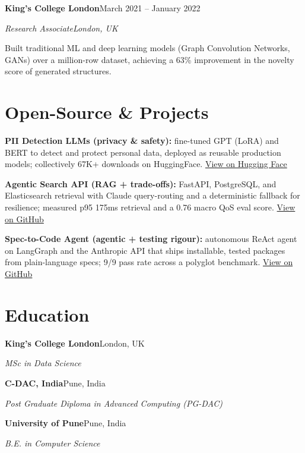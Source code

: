 \documentclass[10pt,a4paper]{article}
\newcommand{\entry}[4]{%
  {\color{company}\bfseries #1}\hfill {\color{muted}#2}\par
  \vspace{1pt}
  {\itshape #3}\hfill {\color{muted}\itshape #4}\par
  \vspace{3pt}%
}
\begin{document}
\entry{King's College London}{March 2021 -- January 2022}{Research Associate}{London, UK}
\begin{tight}
  \item Built traditional ML and deep learning models (Graph Convolution Networks, GANs) over a million-row dataset, achieving a 63\% improvement in the novelty score of generated structures.
\end{tight}

\section{Open-Source \& Projects}
\begin{tight}
  \item \textbf{PII Detection LLMs (privacy \& safety):} fine-tuned GPT (LoRA) and BERT to detect and protect personal data, deployed as reusable production models; collectively 67K+ downloads on HuggingFace. \href{https://huggingface.co/ab-ai/pii_model}{View on Hugging Face}
  \item \textbf{Agentic Search API (RAG + trade-offs):} FastAPI, PostgreSQL, and Elasticsearch retrieval with Claude query-routing and a deterministic fallback for resilience; measured p95 175ms retrieval and a 0.76 macro QoS eval score. \href{https://github.com/abhijeetscode/search-agent}{View on GitHub}
  \item \textbf{Spec-to-Code Agent (agentic + testing rigour):} autonomous ReAct agent on LangGraph and the Anthropic API that ships installable, tested packages from plain-language specs; 9/9 pass rate across a polyglot benchmark. \href{https://github.com/abhijeetscode/Spec-to-Code-Agent}{View on GitHub}
\end{tight}

\section{Education}
{\color{company}\bfseries King's College London}\hfill {\color{muted}London, UK}\par
{\itshape MSc in Data Science}\par\vspace{2pt}
{\color{company}\bfseries C-DAC, India}\hfill {\color{muted}Pune, India}\par
{\itshape Post Graduate Diploma in Advanced Computing (PG-DAC)}\par\vspace{2pt}
{\color{company}\bfseries University of Pune}\hfill {\color{muted}Pune, India}\par
{\itshape B.E. in Computer Science}\par
\end{document}
